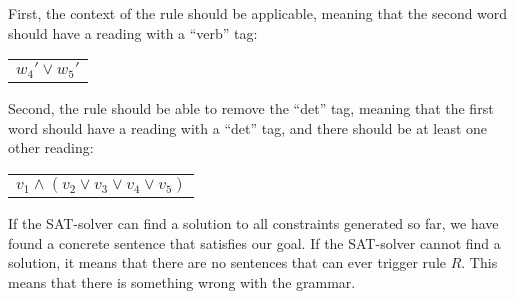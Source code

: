 First, the context of the rule should be applicable, meaning that the second word should have a reading with a ``verb'' tag:
\begin{center}
\begin{tabular}{c}
$w_4' \vee w_5'$
\end{tabular}
\end{center}
Second, the rule should be able to remove the ``det'' tag, meaning that the first word should have a reading with a ``det'' tag, and there should be at least one other reading:
\begin{center}
\begin{tabular}{c}
$v_1 \wedge (v_2 \vee v_3 \vee v_4 \vee v_5)$
\end{tabular}
\end{center}
If the SAT-solver can find a solution to all constraints generated so far, we have found a concrete sentence that satisfies our goal. If the SAT-solver cannot find a solution, it means that there are no sentences that can ever trigger rule $R$. This means that there is something wrong with the grammar.




